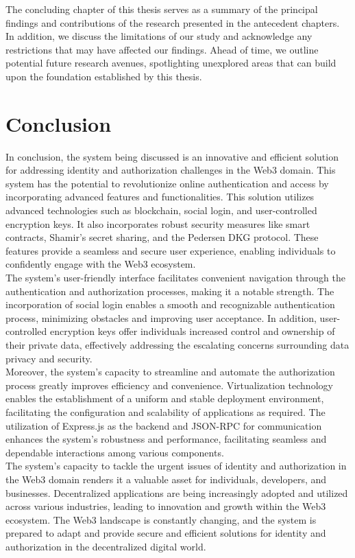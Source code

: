 \documentclass[../Main.tex]{subfiles}
\begin{document}
The concluding chapter of this thesis serves as a summary of the principal findings and contributions of the research presented in the antecedent chapters. In addition, we discuss the limitations of our study and acknowledge any restrictions that may have affected our findings. Ahead of time, we outline potential future research avenues, spotlighting unexplored areas that can build upon the foundation established by this thesis.
\section{Conclusion}
\label{section:6.1}
In conclusion, the system being discussed is an innovative and efficient solution for addressing identity and authorization challenges in the Web3 domain. This system has the potential to revolutionize online authentication and access by incorporating advanced features and functionalities. This solution utilizes advanced technologies such as blockchain, social login, and user-controlled encryption keys. It also incorporates robust security measures like smart contracts, Shamir's secret sharing, and the Pedersen DKG protocol. These features provide a seamless and secure user experience, enabling individuals to confidently engage with the Web3 ecosystem.\\
\indent The system's user-friendly interface facilitates convenient navigation through the authentication and authorization processes, making it a notable strength. The incorporation of social login enables a smooth and recognizable authentication process, minimizing obstacles and improving user acceptance. In addition, user-controlled encryption keys offer individuals increased control and ownership of their private data, effectively addressing the escalating concerns surrounding data privacy and security.\\
\indent Moreover, the system's capacity to streamline and automate the authorization process greatly improves efficiency and convenience. Virtualization technology enables the establishment of a uniform and stable deployment environment, facilitating the configuration and scalability of applications as required. The utilization of Express.js as the backend and JSON-RPC for communication enhances the system's robustness and performance, facilitating seamless and dependable interactions among various components.\\
\indent The system's capacity to tackle the urgent issues of identity and authorization in the Web3 domain renders it a valuable asset for individuals, developers, and businesses. Decentralized applications are being increasingly adopted and utilized across various industries, leading to innovation and growth within the Web3 ecosystem. The Web3 landscape is constantly changing, and the system is prepared to adapt and provide secure and efficient solutions for identity and authorization in the decentralized digital world.\\
\end{document}
